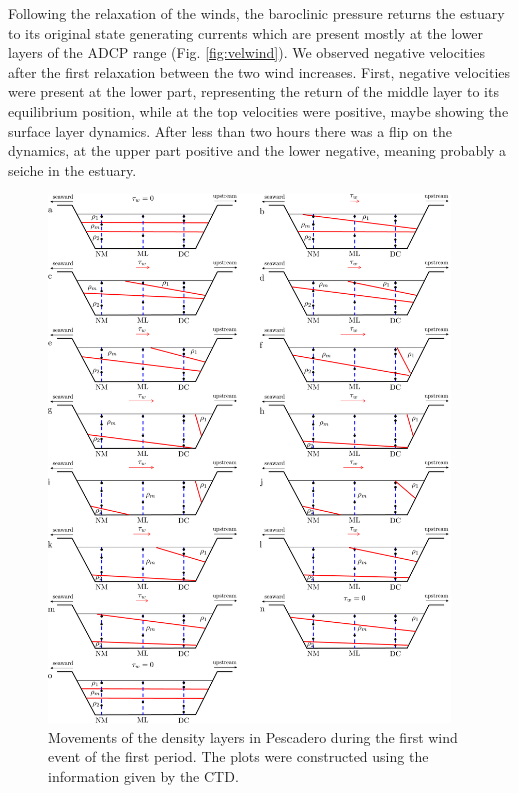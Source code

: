 \documentclass[tesis.tex]{subfiles}
\begin{document}
Following the relaxation of the winds, the baroclinic pressure returns the estuary to its original state generating currents which are present mostly at the lower layers of the ADCP range (Fig. \ref{fig:velwind}). We observed negative velocities after the first relaxation between the two wind increases. First, negative velocities were present at the lower part, representing the return of the middle layer to its equilibrium position, while at the top velocities were positive, maybe showing the surface layer dynamics. After less than two hours there was a flip on the dynamics, at the upper part positive and the lower negative, meaning probably a seiche in the estuary.\\

\newpage
\begin{figure}[h!]
    \centering
    \includegraphics[width=0.95\textwidth]{Imagenes/wind_event.png}
    \caption{Movements of the density layers in Pescadero during the first wind event of the first period. The plots were constructed using the information given by the CTD.}
    \label{fig:wevent}
\end{figure}
\end{document}
